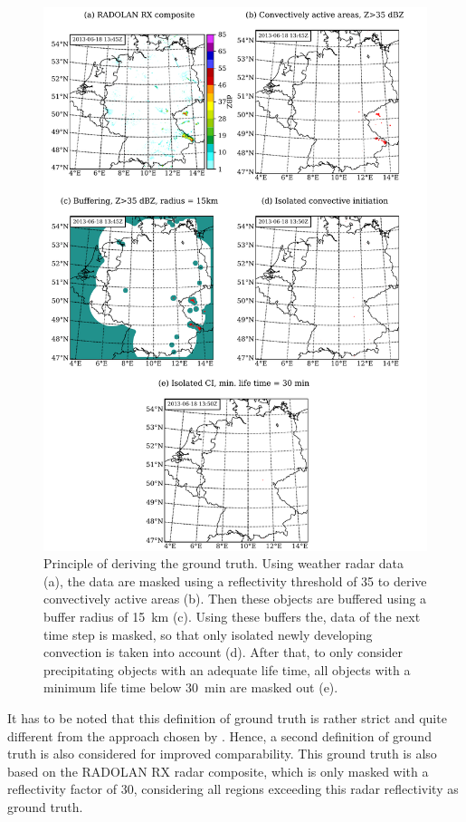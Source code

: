 \begin{figure}[htbp]
\centering
\includegraphics[height=\textheight]{Grafiken/Abbildungen/haberlie_prinzip.pdf}
\caption{Principle of deriving the ground truth. Using weather radar data (a), the data are masked using a reflectivity threshold of \SI{35}{\dbZ} to derive convectively active areas (b). Then these objects are buffered using a buffer radius of \SI{15}{\kilo\metre} (c). Using these buffers the, data of the next time step is masked, so that only isolated newly developing convection is taken into account (d). After that, to only consider precipitating objects with an adequate life  time, all objects with a minimum life time below \SI{30}{min} are masked out (e).}
\label{fig:haberlie}
\end{figure}

It has to be noted that this definition of ground truth is rather strict and quite different from the approach chosen by \citet{Karagiannidis2016}. Hence, a second definition of ground truth is also considered for improved comparability. This ground truth is also based on the RADOLAN RX radar composite, which is only masked with a reflectivity factor of \SI{30}{\dbZ}, considering all regions exceeding this radar reflectivity as ground truth.

